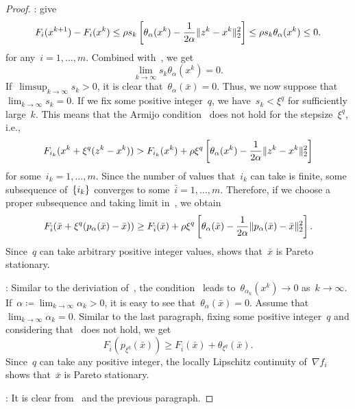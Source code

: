 \documentclass[../main]{subfiles}
\begin{document}
\begin{proof}
    :
     give
    \begin{equation}
        F_i(x^{k + 1}) - F_i(x^k) \le \rho s_k \left[ \theta_\alpha(x^k) - \frac{1}{2 \alpha} \lVert z^k - x^k\rVert_2^2\right] \le \rho s_k \theta_\alpha(x^k) \le 0
    .\end{equation} 
    for any~$i = 1, \dots, m$.
    Combined with~, we get
    \begin{equation} \label{eq:pgm_stationary:step_merit_zero}
        \lim_{k \to \infty} s_k \theta_\alpha(x^k) = 0
    .\end{equation}
    If~$\limsup_{k \to \infty} s_k > 0$, it is clear that~$\theta_\alpha(\bar{x}) = 0$.
    Thus, we now suppose that~$\lim_{k \to \infty} s_k = 0$.
    If we fix some positive integer~$q$, we have~$s_k < \xi^q$ for sufficiently large~$k$.
    This means that the Armijo condition~ does not hold for the stepsize~$\xi^q$, i.e.,
    \begin{equation} \label{eq:pgm_stationary:non_armijo}
        F_{i_k}(x^k + \xi^q (z^k - x^k)) > F_{i_k}(x^k) + \rho \xi^q \left[ \theta_\alpha(x^k) - \frac{1}{2 \alpha} \lVert z^k - x^k\rVert_2^2 \right]
    \end{equation} 
    for some~$i_k = 1, \dots, m$.
    Since the number of values that~$i_k$ can take is finite, some subsequence of~$\lbrace i_k\rbrace$ converges to some~$\bar{i} = 1, \dots, m$.
    Therefore, if we choose a proper subsequence and taking limit in~, we obtain
    \begin{equation}
        F_{\bar{i}}(\bar{x} + \xi^q (p_\alpha(\bar{x}) - \bar{x})) \ge F_{\bar{i}}(\bar{x}) + \rho \xi^q \left[ \theta_\alpha(\bar{x}) - \frac{1}{2 \alpha} \lVert p_\alpha(\bar{x}) - \bar{x}\rVert_2^2 \right]
    .\end{equation} 
    Since~$q$ can take arbitrary positive integer values,  shows that~$\bar{x}$ is Pareto stationary.

    :
    Similar to the deriviation of~, the condition~ leads to~$\theta_{\alpha_k}(x^k) \to 0$ as~$k \to \infty$.
    If~$\alpha \coloneqq \lim_{k \to \infty} \alpha_k > 0$, it is easy to see that~$\theta_\alpha(\bar{x}) = 0$.
    Assume that~$\lim_{k \to \infty} \alpha_k = 0$.
    Similar to the last paragraph, fixing some positive integer~$q$ and considering that~ does not hold, we get
    \begin{equation}
        F_{\bar{i}}(p_{\xi^q}(\bar{x})) \ge F_{\bar{i}}(\bar{x}) + \theta_{\xi^q}(\bar{x})
    .\end{equation} 
    Since~$q$ can take any positive integer, the locally Lipschitz continuity of~$\nabla f_i$ shows that~$\bar{x}$ is Pareto stationary.

    :
    It is clear from~ and the previous paragraph.
\end{proof}
\end{document}
